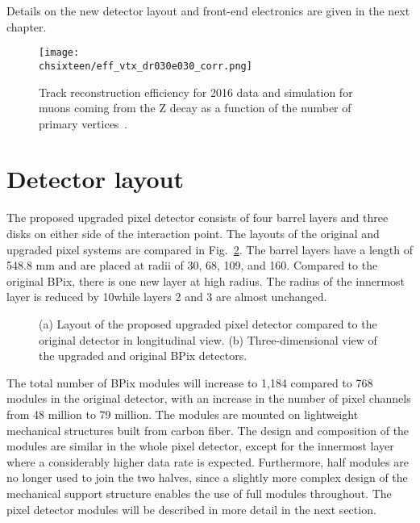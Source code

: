 Details on the new detector layout and front-end electronics are given in the next chapter.

\begin{figure}[!htb]
 \begin{center}
 \texttt{[image: \\chsixteen/eff\_vtx\_dr030e030\_corr.png]}
 \end{center}
 \caption{Track reconstruction efficiency for 2016 data and simulation for muons coming from the Z decay as a function of the number of primary vertices~\cite{TrkCMSPublicResults}.}
 \label{fig:trackEffPix}
\end{figure}

\section{Detector layout}

The proposed upgraded pixel detector consists of four barrel layers and three disks on either side of the interaction point.
The layouts of the original and upgraded pixel systems are compared in Fig.~\ref{fig:Phase1Layout}.
The barrel layers have a length of 548.8 mm and are placed at radii of 30, 68, 109, and 160\mm. Compared to the original BPix, there is one new layer at high radius.
The radius of the innermost layer is reduced by 10\mm while layers 2 and 3 are almost unchanged. 

\begin{figure}[!htb]
 \begin{center}
 \hspace{0.2cm}
 \end{center}
 \caption{(a) Layout of the proposed upgraded pixel detector compared to the original detector in longitudinal view. (b) Three-dimensional view of the upgraded and original BPix detectors.}
 \label{fig:Phase1Layout}
\end{figure}

The total number of BPix modules will increase to 1,184 compared to 768 modules in the original detector, with an increase in the number of pixel channels from 48 million to 79 million.
The modules are mounted on lightweight mechanical structures built from carbon fiber.
The design and composition of the modules are similar in the whole pixel detector, except for the innermost layer where a considerably higher data rate is expected.
Furthermore, half modules are no longer used to join the two halves, since a slightly more complex design of the mechanical support structure enables the use of full modules throughout.
The pixel detector modules will be described in more detail in the next section.

